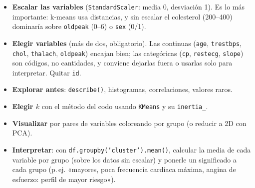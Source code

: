 \documentclass[a4paper,11pt]{article}
\begin{document}
\begin{itemize}
  \item \textbf{Escalar las variables} (\texttt{StandardScaler}: media 0, desviación 1). Es lo más importante: k-means usa
        distancias, y sin escalar el colesterol (200--400) dominaría sobre \texttt{oldpeak} (0--6) o \texttt{sex} (0/1).
  \item \textbf{Elegir variables} (más de dos, obligatorio). Las continuas (\texttt{age}, \texttt{trestbps}, \texttt{chol},
        \texttt{thalach}, \texttt{oldpeak}) encajan bien; las categóricas (\texttt{cp}, \texttt{restecg}, \texttt{slope}) son
        códigos, no cantidades, y conviene dejarlas fuera o usarlas solo para interpretar. Quitar \texttt{id}.
  \item \textbf{Explorar antes}: \texttt{describe()}, histogramas, correlaciones, valores raros.
  \item \textbf{Elegir $k$} con el método del codo usando \texttt{KMeans} y su \texttt{inertia\_}.
  \item \textbf{Visualizar} por pares de variables coloreando por grupo (o reducir a 2D con PCA).
  \item \textbf{Interpretar}: con \texttt{df.groupby('cluster').mean()}, calcular la media de cada variable por grupo
        (sobre los datos sin escalar) y ponerle un significado a cada grupo
        (p.\,ej. «mayores, poca frecuencia cardíaca máxima, angina de esfuerzo: perfil de mayor riesgo»).
\end{itemize}
\end{document}

